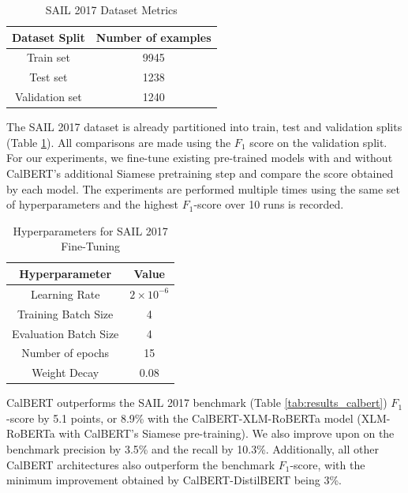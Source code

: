 \documentclass[conference]{IEEEtran}
\begin{document}
\begin{table}[htpb]
    \centering
    \caption{SAIL 2017 Dataset Metrics}
    \label{tab:sail_dataset}
    \begin{tabular}{|c|c|}
    \hline 
        \textbf{Dataset Split} & \textbf{Number of examples} \\
    \hline
        Train set & 9945 \\
    \hline
        Test set & 1238 \\
    \hline
        Validation set & 1240 \\
    \hline
    \end{tabular}
\end{table}

The SAIL 2017 dataset is already partitioned into train, test and validation splits (Table \ref{tab:sail_dataset}). All comparisons are made using the $F_1$ score on the validation split. For our experiments, we fine-tune existing pre-trained models with and without CalBERT's additional Siamese pretraining step and compare the score obtained by each model. The experiments are performed multiple times using the same set of hyperparameters and the highest $F_1$-score over 10 runs is recorded.

\begin{table}[htbp]
    \centering
    \caption{Hyperparameters for SAIL 2017 Fine-Tuning}
    \label{tab:finetuning_hyperparams}
    \begin{tabular}{|c|c|}
    \hline
        \textbf{Hyperparameter} & \textbf{Value}  \\
    \hline
        Learning Rate & $2 \times 10^{-6}$ \\
    \hline 
        Training Batch Size & 4 \\
    \hline 
        Evaluation Batch Size & 4 \\
    \hline 
        Number of epochs & 15 \\
    \hline 
        Weight Decay & 0.08 \\
    \hline
    \end{tabular}
\end{table}

CalBERT outperforms the SAIL 2017 benchmark (Table \ref{tab:results_calbert}) $F_1$-score by 5.1 points, or 8.9\% with the CalBERT-XLM-RoBERTa model (XLM-RoBERTa with CalBERT's Siamese pre-training). We also improve upon on the benchmark precision by 3.5\% and the recall by 10.3\%. Additionally, all other CalBERT architectures also outperform the benchmark $F_1$-score, with the minimum improvement obtained by CalBERT-DistilBERT being 3\%.
\end{document}
